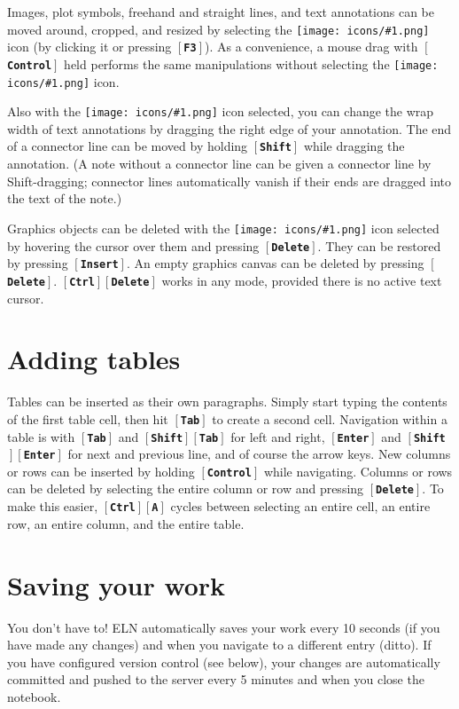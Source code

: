 \documentclass[11pt]{report}
\def\keystroke#1{$\left[\right.\!${\tt\bfseries #1}$\!\left.\right]$}
\def\key#1{\keystroke{#1}}
\def\keycombo#1#2{\keystroke{#1}\keystroke{#2}}
\def\keycontrol#1{\keycombo{Ctrl}{#1}}
\def\keyshift#1{\keycombo{Shift}{#1}}
\def\icon#1{\raise-2pt\hbox{\texttt{[image: icons/\#1.png]}}}
\begin{document}
Images, plot symbols, freehand and straight lines, and text
annotations can be moved around, cropped, and resized by selecting the
\icon{move} icon (by clicking it or pressing \key{F3}). As a
convenience, a mouse drag with \key{Control} held performs the same
manipulations without selecting the \icon{move} icon. 

Also with the \icon{move} icon selected, you can change
the wrap width of text annotations by dragging the right edge of your
annotation. The end of a connector line can be moved by holding
\key{Shift} while dragging the annotation. (A note without a connector
line can be given a connector line by Shift-dragging; connector lines
automatically vanish if their ends are dragged into the text of the
note.)

Graphics objects can be deleted with the \icon{move} icon selected by
hovering the cursor over them and pressing \key{Delete}. They can be
restored by pressing \key{Insert}. An empty graphics canvas can be
deleted by pressing \key{Delete}. \keycontrol{Delete} works in any
mode, provided there is no active text cursor.

\section{Adding tables}

Tables can be inserted as their own paragraphs. Simply start typing
the contents of the first table cell, then hit \key{Tab} to create a
second cell. Navigation within a table is with \key{Tab} and
\keyshift{Tab} for left and right, \key{Enter} and \keyshift{Enter}
for next and previous line, and of course the arrow keys. New columns
or rows can be inserted by holding \key{Control} while
navigating. Columns or rows can be deleted by selecting the entire
column or row and pressing \key{Delete}. To make this easier,
\keycontrol{A} cycles between selecting an entire cell, an entire row,
an entire column, and the entire table.

\section{Saving your work}

You don't have to! ELN automatically saves your work every 10 seconds
(if you have made any changes) and when you navigate to a different
entry (ditto). If you have configured version control (see below),
your changes are automatically committed and pushed to the server
every 5 minutes and when you close the notebook.
\end{document}
